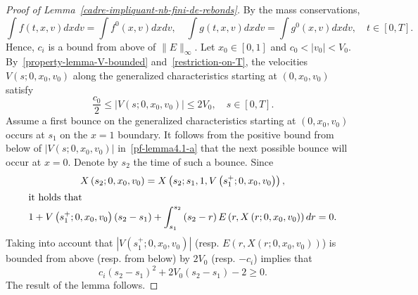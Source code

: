 \documentclass[AHL,Unicode,longabstracts,published]{cedram}
\begin{document}
\begin{proof}[{Proof of Lemma~\ref{cadre-impliquant-nb-fini-de-rebonds}}]
By the mass conservations,
\[
\int f(t,x,v)dxdv= \int f^0(x,v)dxdv, \quad \int g(t,x,v)dxdv= \int g^0(x,v)dxdv, \quad t\in [0,T].
\]
Hence, $c_i$ is a bound from above of $\|E\|_{\infty}$. Let $x_0 \in [0,1]$ and $c_0<|v_0|<V_0$. By~\eqref{property-lemma-V-bounded} and~\eqref{restriction-on-T}, the velocities $V(s;0,x_0,v_0)$ along the generalized characteristics starting at $(0,x_0,v_0)$ satisfy
\begin{equation}\label{pf-lemma4.1-a}
\frac{c_0}{2}\leq |V(s;0,x_0,v_0)| \leq 2V_0,\quad s\in [0,T].
\end{equation}
Assume a first bounce on the generalized characteristics starting at $(0,x_0,v_0)$ occurs at $s_1$ on the $x=1$ boundary. It follows from the positive bound from below of $|V(s;0,x_0,v_0)|$ in~\eqref{pf-lemma4.1-a} that the next possible bounce will occur at $x=0$. Denote by $s_2$ the time of such a bounce. Since
\begin{gather*}
X\left(s_2;0,x_0,v_0\right) = X\left(s_2;s_1,1,V\left(s_1^+;0,x_0,v_0\right)\right),
\\
\intertext{it holds that}
1+V\left(s_1^+;0,x_0,v_0\right)\left(s_2-s_1\right)+\int_{s_1}^{s_2}\left(s_2-r\right)E\left(r,X\left(r;0,x_0,v_0\right)\right)dr = 0.
\end{gather*}
Taking into account that $| V(s_1^+;0,x_0,v_0)| $ (resp. $E(r,X(r;0,x_0,v_0))$) is bounded from above (resp. from below) by $2V_0$ (resp. $-c_i$) implies that
\[
c_i\left(s_2-s_1\right)^2+2V_0\left(s_2-s_1\right)-2\geq 0.
\]
The result of the lemma follows.
\end{proof}
\end{document}
